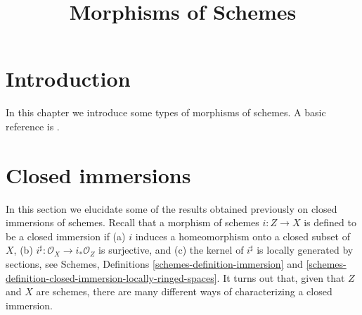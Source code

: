 

%


\title{Morphisms of Schemes}


\maketitle

\label{section-phantom}

\tableofcontents

\section{Introduction}
\label{section-introduction}

\noindent
In this chapter we introduce some types of morphisms of schemes.
A basic reference is \cite{EGA}.




















\section{Closed immersions}
\label{section-closed-immersions}

\noindent
In this section we elucidate some of the results obtained previously on closed
immersions of schemes. Recall that a morphism of schemes $i : Z \to X$
is defined to be a closed immersion if (a) $i$ induces a homeomorphism onto
a closed subset of $X$, (b) $i^\sharp : \mathcal{O}_X \to i_*\mathcal{O}_Z$
is surjective, and (c) the kernel of $i^\sharp$ is locally generated by
sections, see Schemes, Definitions \ref{schemes-definition-immersion}
and \ref{schemes-definition-closed-immersion-locally-ringed-spaces}. It turns
out that, given that $Z$ and $X$ are schemes, there are many different
ways of characterizing a closed immersion.

